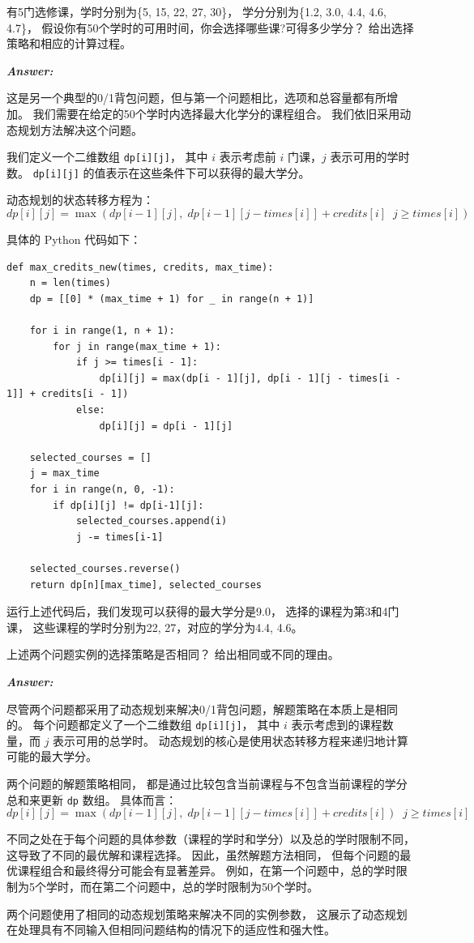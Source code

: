 \documentclass[12pt]{article}
\newenvironment{Answer}{
  \vspace{12pt}
  {\large\textbf{\textit{\hspace{-12pt}Answer:}}}\par
  \vspace{8pt}
} {\vspace{24pt}}
\begin{document}
\begin{question}{}{}
有5门选修课，学时分别为\{5, 15, 22, 27, 30\}，
学分分别为\{1.2, 3.0, 4.4, 4.6, 4.7\}，
假设你有50个学时的可用时间，你会选择哪些课?可得多少学分？
给出选择策略和相应的计算过程。
\end{question}
\begin{Answer}
这是另一个典型的0/1背包问题，但与第一个问题相比，选项和总容量都有所增加。
我们需要在给定的50个学时内选择最大化学分的课程组合。
我们依旧采用动态规划方法解决这个问题。

我们定义一个二维数组 \texttt{dp[i][j]}，
其中 \(i\) 表示考虑前 \(i\) 门课，\(j\) 表示可用的学时数。
\texttt{dp[i][j]} 的值表示在这些条件下可以获得的最大学分。

动态规划的状态转移方程为：
$$dp[i][j]=\max(dp[i-1][j],\;dp[i-1][j-times[i]] + credits[i]\;\;j\geq times[i])$$

具体的 Python 代码如下：
\begin{lstlisting}
def max_credits_new(times, credits, max_time):
    n = len(times)
    dp = [[0] * (max_time + 1) for _ in range(n + 1)]

    for i in range(1, n + 1):
        for j in range(max_time + 1):
            if j >= times[i - 1]:
                dp[i][j] = max(dp[i - 1][j], dp[i - 1][j - times[i - 1]] + credits[i - 1])
            else:
                dp[i][j] = dp[i - 1][j]

    selected_courses = []
    j = max_time
    for i in range(n, 0, -1):
        if dp[i][j] != dp[i-1][j]:
            selected_courses.append(i)
            j -= times[i-1]

    selected_courses.reverse()
    return dp[n][max_time], selected_courses
\end{lstlisting}

运行上述代码后，我们发现可以获得的最大学分是9.0，
选择的课程为第3和4门课，
这些课程的学时分别为22, 27，对应的学分为4.4, 4.6。
\end{Answer}

\begin{question}{}{}
上述两个问题实例的选择策略是否相同？
给出相同或不同的理由。
\end{question}
\begin{Answer}
尽管两个问题都采用了动态规划来解决0/1背包问题，解题策略在本质上是相同的。
每个问题都定义了一个二维数组 \texttt{dp[i][j]}，
其中 \(i\) 表示考虑到的课程数量，而 \(j\) 表示可用的总学时。
动态规划的核心是使用状态转移方程来递归地计算可能的最大学分。

两个问题的解题策略相同，
都是通过比较包含当前课程与不包含当前课程的学分总和来更新 \texttt{dp} 数组。
具体而言：
$$dp[i][j]=\max(dp[i-1][j],\;dp[i-1][j-times[i]] + credits[i])\;\;j\geq times[i]$$

不同之处在于每个问题的具体参数（课程的学时和学分）以及总的学时限制不同，
这导致了不同的最优解和课程选择。
因此，虽然解题方法相同，
但每个问题的最优课程组合和最终得分可能会有显著差异。
例如，在第一个问题中，总的学时限制为5个学时，而在第二个问题中，总的学时限制为50个学时。

两个问题使用了相同的动态规划策略来解决不同的实例参数，
这展示了动态规划在处理具有不同输入但相同问题结构的情况下的适应性和强大性。
\end{Answer}
\end{document}

